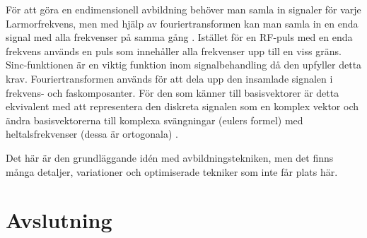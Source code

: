 \documentclass[11pt, a4paper]{article}
\begin{document}
För att göra en endimensionell avbildning behöver man samla in signaler för varje Larmorfrekvens, men med hjälp av fouriertransformen kan man samla in en enda signal med alla frekvenser på samma gång \parencite{mri_lärobok}. Istället för en RF-puls med en enda frekvens används en puls som innehåller alla frekvenser upp till en viss gräns. Sinc-funktionen är en viktig funktion inom signalbehandling då den upfyller detta krav. Fouriertransformen används för att dela upp den insamlade signalen i frekvens- och faskomposanter. För den som känner till basisvektorer är detta ekvivalent med att representera den diskreta signalen som en komplex vektor och ändra basisvektorerna till komplexa svängningar (eulers formel) med heltalsfrekvenser (dessa är ortogonala) \parencite{dsp_bok_kapitel}.

Det här är den grundläggande idén med avbildningstekniken, men det finns många detaljer, variationer och optimiserade tekniker som inte får plats här.

\clearpage
\section{Avslutning}

\clearpage
\printbibliography
\end{document}
